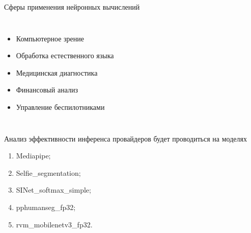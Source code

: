 \documentclass[aspectratio=169,xcolor=dvipsnames]{beamer}
\begin{document}
\begin{frame}{Сферы применения нейронных вычислений}
    \begin{columns}[c] %

        \begin{itemize}
            \item Компьютерное зрение
            \item Обработка естественного языка
            \item Медицинская диагностика
            \item Финансовый анализ
            \item Управление беспилотниками
        \end{itemize}

        \begin{figure}[h]
            \label{ris:ORTModelData}
        \end{figure}
        
    \end{columns}
\end{frame}


\begin{frame}{Анализ эффективности инференса провайдеров будет проводиться на моделях}
    \begin{enumerate} 
      \item Mediapipe;
      \item Selfie\_segmentation;
      \item SINet\_softmax\_simple;
      \item pphumanseg\_fp32;
      \item rvm\_mobilenetv3\_fp32.
    \end{enumerate}
\end{frame}
\end{document}
